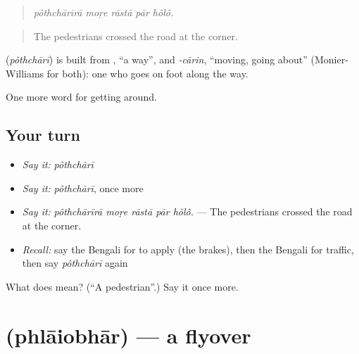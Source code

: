 \begin{quote}
    
\end{quote}

\begin{quote}
\emph{pôthchārīrā moṛe rāstā pār hôlô.}
\end{quote}

\begin{quote}
The pedestrians crossed the road at the corner.
\end{quote}

\begin{cousinweb}
\textbf{} (\emph{pôthchārī}) is built from \textbf{}, \textquotedblleft{}a way\textquotedblright{}, and \emph{-cārin}, \textquotedblleft{}moving, going about\textquotedblright{} (Monier-Williams for both): one who goes on foot along the way.
\end{cousinweb}

\begin{grammarlens}[title={What you've built}]
One more word for getting around.
\end{grammarlens}

\subsection*{Your turn}
\begin{itemize}
\raggedright
  \item \emph{Say it:} \emph{pôthchārī}
  \item \emph{Say it:} \emph{pôthchārī}, once more
  \item \emph{Say it:} \emph{pôthchārīrā moṛe rāstā pār hôlô.} — The pedestrians crossed the road at the corner.
  \item \emph{Recall:} say the Bengali for to apply (the brakes), then the Bengali for traffic, then say \emph{pôthchārī} again
\end{itemize}

\begin{tcolorbox}[breakable,colback=teal!4,colframe=teal!35!black,title={Before you move on}]
What does  mean? (\textquotedblleft{}A pedestrian\textquotedblright{}.) Say it once more.
\end{tcolorbox}
\section[\texorpdfstring{\bn{ফ্লাইওভার} (phlāiobhār)}{ফ্লাইওভার (phlāiobhār)}]{ (phlāiobhār) — a flyover}

